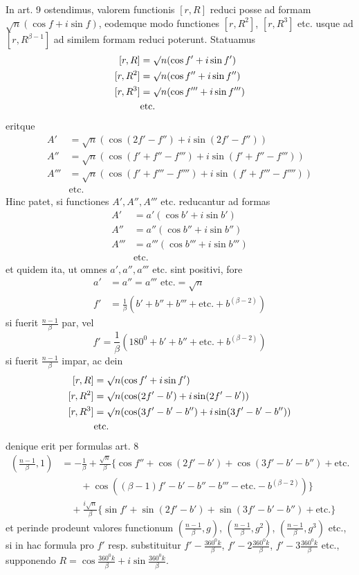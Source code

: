 In art. 9 ostendimus, valorem functionis $[r,R]$ reduci posse ad formam $\surd n(\cos f+i\sin f)$, eodemque modo functiones $[r,R^2]$, $[r,R^3]$ etc. usque ad $[r,R^{\beta-1}]$ ad similem formam reduci poterunt. Statuamus
\[
\begin{aligned}
[r,R]&=\surd n(\cos f'+i\sin f')\\
\relax[r,R^2]&=\surd n(\cos f''+i\sin f'')\\
\relax[r,R^3]&=\surd n(\cos f'''+i\sin f''')\\
&\text{etc.}
\end{aligned}
\]
eritque
\[
\begin{aligned}
A'&=\surd n(\cos(2f'-f'')+i\sin(2f'-f''))\\
A''&=\surd n(\cos(f'+f''-f''')+i\sin(f'+f''-f'''))\\
A'''&=\surd n(\cos(f'+f'''-f'''')+i\sin(f'+f'''-f''''))\\
&\text{etc.}
\end{aligned}
\]
Hinc patet, si functiones $A',A'',A'''$ etc. reducantur ad formas
\[
\begin{aligned}
A'&=a'(\cos b'+i\sin b')\\
A''&=a''(\cos b''+i\sin b'')\\
A'''&=a'''(\cos b'''+i\sin b''')\\
&\text{etc.}
\end{aligned}
\]
et quidem ita, ut omnes $a',a'',a'''$ etc. sint positivi, fore
\[
\begin{aligned}
a'&=a''=a'''\text{ etc.}=\surd n\\
f'&=\frac1\beta(b'+b''+b'''+\text{etc.}+b^{(\beta-2)})
\end{aligned}
\]
si fuerit $\frac{n-1}\beta$ par, vel
\[
f'=\frac1\beta(180^0+b'+b''+\text{etc.}+b^{(\beta-2)})
\]
si fuerit $\frac{n-1}\beta$ impar, ac dein
\[
\begin{aligned}
[r,R]&=\surd n(\cos f'+i\sin f')\\
\relax[r,R^2]&=\surd n(\cos(2f'-b')+i\sin(2f'-b'))\\
\relax[r,R^3]&=\surd n(\cos(3f'-b'-b'')+i\sin(3f'-b'-b''))\\
&\text{etc.}
\end{aligned}
\]
denique erit per formulas art. 8
\[
\begin{aligned}
\left(\frac{n-1}\beta,1\right)&=-\frac1\beta+\frac{\surd n}\beta\{\cos f''+\cos(2f'-b')+\cos(3f'-b'-b'')+\text{etc.}\\
&\qquad+\cos((\beta-1)f'-b'-b''-b'''-\text{etc.}-b^{(\beta-2)})\}\\
&\quad+\frac{i\surd n}\beta\{\sin f'+\sin(2f'-b')+\sin(3f'-b'-b'')+\text{etc.}\}
\end{aligned}
\]
et perinde prodeunt valores functionum $\left(\frac{n-1}\beta,g\right)$, $\left(\frac{n-1}\beta,g^2\right)$, $\left(\frac{n-1}\beta,g^3\right)$ etc., si in hac formula pro $f'$ resp. substituitur $f'-\frac{360^0k}\beta$, $f'-2\frac{360^0k}\beta$, $f'-3\frac{360^0k}\beta$ etc., supponendo $R=\cos\frac{360^0k}\beta+i\sin\frac{360^0k}\beta$.

